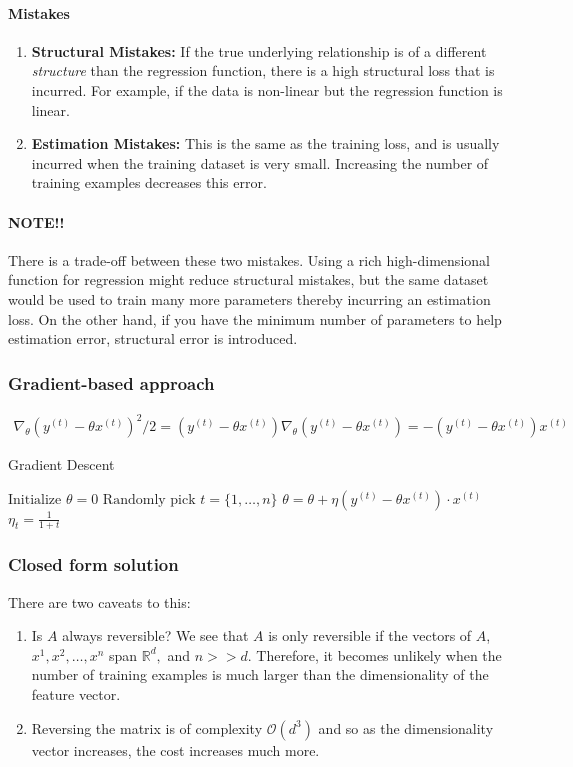 \documentclass{article}
\begin{document}
\paragraph{Mistakes}
\begin{enumerate}
	\item \textbf{Structural Mistakes:} If the true underlying relationship is of a different \emph{structure} than the regression function, there is a high structural loss that is incurred. For example, if the data is non-linear but the regression function is linear.
	\item \textbf{Estimation Mistakes:} This is the same as the training loss, and is usually incurred when the training dataset is very small. Increasing the number of training examples decreases this error.
\end{enumerate}

\paragraph{NOTE!!} There is a trade-off between these two mistakes. Using a rich high-dimensional function for regression might reduce structural mistakes, but the same dataset would be used to train many more parameters thereby incurring an estimation loss. On the other hand, if you have the minimum number of parameters to help estimation error, structural error is introduced.

\subsubsection{Gradient-based approach}
\begin{align*}
	\nabla_\theta\left(y^{(t)}-\theta x^{(t)}\right)^2/2=
	\left(y^{(t)}-\theta x^{(t)}\right)\nabla_\theta\left(y^{(t)}-\theta x^{(t)}\right)=-\left(y^{(t)}-\theta x^{(t)}\right)x^{(t)}
\end{align*}

\begin{algorithm}
	\caption{Gradient Descent}
	\begin{algorithmic}
	\State $\text{Initialize }\theta=0$
	\State $\text{Randomly pick }t=\{1,\ldots,n\}$
	\State $\theta=\theta+\eta\left(y^{(t)}-\theta x^{(t)}\right)\cdot x^{(t)}$
	\State  $\eta_t=\frac{1}{1+t}$
	\end{algorithmic}
\end{algorithm}
\newpage
\subsubsection{Closed form solution}
There are two caveats to this:
\begin{enumerate}
	\item Is $A$ always reversible? We see that $A$ is only reversible if the vectors of $A$, $x^1,x^2,\ldots,x^n$ span $\mathbb{R}^d,$ and $n>>d$. Therefore, it becomes unlikely when the number of training examples is much larger than the dimensionality of the feature vector.
	\item Reversing the matrix is of complexity $\mathcal{O}(d^3)$ and so as the dimensionality vector increases, the cost increases much more.
\end{enumerate}
\end{document}
